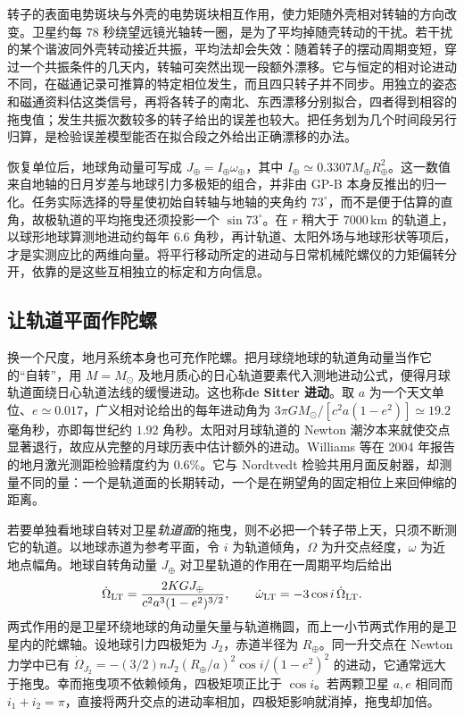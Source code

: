 转子的表面电势斑块与外壳的电势斑块相互作用，使力矩随外壳相对转轴的方向改变。卫星约每 $78$ 秒绕望远镜光轴转一圈，是为了平均掉随壳转动的干扰。若干扰的某个谐波同外壳转动接近共振，平均法却会失效：随着转子的摆动周期变短，穿过一个共振条件的几天内，转轴可突然出现一段额外漂移。它与恒定的相对论进动不同，在磁通记录可推算的特定相位发生，而且四只转子并不同步。用独立的姿态和磁通资料估这类信号，再将各转子的南北、东西漂移分别拟合，四者得到相容的拖曳值；发生共振次数较多的转子给出的误差也较大。把任务划为几个时间段另行归算，是检验误差模型能否在拟合段之外给出正确漂移的办法。

恢复单位后，地球角动量可写成 $J_\oplus=I_\oplus\omega_\oplus$，其中 $I_\oplus\simeq0.3307M_\oplus R_\oplus^2$。这一数值来自地轴的日月岁差与地球引力多极矩的组合，并非由 GP-B 本身反推出的归一化。任务实际选择的导星使初始自转轴与地轴的夹角约 $73^\circ$，而不是便于估算的直角，故极轨道的平均拖曳还须投影一个 $\sin73^\circ$。在 $r$ 稍大于 $7000\,\mathrm{km}$ 的轨道上，以球形地球算测地进动约每年 $6.6$ 角秒，再计轨道、太阳外场与地球形状等项后，才是实测应比的两维向量。将平行移动所定的进动与日常机械陀螺仪的力矩偏转分开，依靠的是这些互相独立的标定和方向信息。

\subsection{让轨道平面作陀螺}

换一个尺度，地月系统本身也可充作陀螺。把月球绕地球的轨道角动量当作它的“自转”，用 $M=M_\odot$ 及地月质心的日心轨道要素代入测地进动公式，便得月球轨道面绕日心轨道法线的缓慢进动。这也称\textbf{de Sitter 进动}。取 $a$ 为一个天文单位、$e\simeq0.017$，广义相对论给出的每年进动角为 $3\pi GM_\odot/[c^2a(1-e^2)]\simeq19.2$ 毫角秒，亦即每世纪约 $1.92$ 角秒。太阳对月球轨道的 Newton 潮汐本来就使交点显著退行，故应从完整的月球历表中估计额外的进动。Williams 等在 2004 年报告的地月激光测距检验精度约为 $0.6\%$。它与 Nordtvedt 检验共用月面反射器，却测量不同的量：一个是轨道面的长期转动，一个是在朔望角的固定相位上来回伸缩的距离。

若要单独看地球自转对卫星\emph{轨道面}的拖曳，则不必把一个转子带上天，只须不断测它的轨道。以地球赤道为参考平面，令 $i$ 为轨道倾角，$\Omega$ 为升交点经度，$\omega$ 为近地点幅角。地球自转角动量 $J_\oplus$ 对卫星轨道的作用在一周期平均后给出
\[
    \dot\Omega_{\rm LT}=\frac{2KGJ_\oplus}{c^2a^3(1-e^2)^{3/2}},\qquad
    \dot\omega_{\rm LT}=-3\cos i\,\dot\Omega_{\rm LT}.
\]
两式作用的是卫星环绕地球的角动量矢量与轨道椭圆，而上一小节两式作用的是卫星内的陀螺轴。设地球引力四极矩为 $J_2$，赤道半径为 $R_\oplus$。同一升交点在 Newton 力学中已有 $\dot\Omega_{J_2}=-(3/2)nJ_2(R_\oplus/a)^2\cos i/(1-e^2)^2$ 的进动，它通常远大于拖曳。幸而拖曳项不依赖倾角，四极矩项正比于 $\cos i$。若两颗卫星 $a,e$ 相同而 $i_1+i_2=\pi$，直接将两升交点的进动率相加，四极矩影响就消掉，拖曳却加倍。

